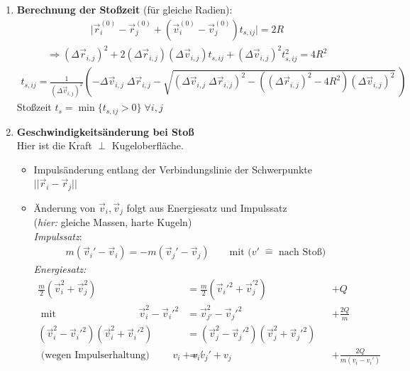 \documentclass[12pt]{article}
\begin{document}
\begin{enumerate}
\item \textbf{Berechnung der Stoßzeit} (für gleiche Radien): 
\begin{align*}
\vert \vec{r}_i^{(0)} - \vec{r}_j^{(0)} + \left( \vec{v}_i^{(0)} - \vec{v}_j^{(0)} \right) t_{s,ij}  \vert = 2 R 
\end{align*}
\begin{align*}
\Rightarrow (\Delta \vec{r}_{i,j})^2 + 2(\Delta \vec{r}_{i,j})( \Delta\vec{v}_{i,j}) t_{s,ij} + (\Delta \vec{v}_{i,j})^2 t_{s,ij}^2 = 4R^2 
\end{align*}
\begin{align*}
t_{s,ij} =
 \frac{1}{(\Delta \vec{v}_{i,j})^2} 
 \left( 
 - \Delta \vec{v}_{i,j} \; \Delta \vec{r}_{i,j} - \sqrt{( \Delta \vec{v}_{i,j} \; \Delta \vec{r}_{i,j})^2 - \left( (\Delta \vec{r}_{i,j})^2 - 4R^2\right) (\Delta \vec{v}_{i,j})^2} \; \right)
\end{align*}
Stoßzeit $t_s = \min \{ t_{s,ij} > 0\} \; \forall i,j$
\item \textbf{Geschwindigkeitsänderung bei Stoß} \\
Hier ist die Kraft $\perp$ Kugeloberfläche.
\begin{itemize}
\item Impulsänderung  entlang der Verbindungslinie der Schwerpunkte $|| \vec{r}_{i} - \vec{r}_{j} ||$
\item Änderung von $\vec{v}_{i}, \vec{v}_{j}$ folgt aus Energiesatz und Impulssatz \\
(\textit{hier:} gleiche Massen, harte Kugeln)\\ 
\textit{Impulssatz}: 
\begin{align*}
m( \vec{v}_{i}' - \vec{v}_{i}) = -m ( \vec{v}_{j}' - \vec{v}_{j})   \qquad \text{mit } (v'\; \widehat{=} \text{ nach Stoß)} 
\end{align*} 
\textit{Energiesatz:}
\begin{align*}
\frac{m}{2} (\vec{v}_{i}^2 + \vec{v}_{j}^2) &= \frac{m}{2} (\vec{v}_{i}'^2  + \vec{v}_{j}^{'2}) && + Q \\
 \mbox{ mit } \qquad \qquad \qquad \qquad  \vec{v}_{i}^2 - \vec{v}_{i}'^2 &= \vec{v}_{j'}^2 - \vec{v}_{j}'^2 && + \frac{2Q}{m} \\ 
 (\vec{v}_{i}^2-\vec{v}_{i}'^2)(\vec{v}_{i}^2 + \vec{v}_{i}'^2) &= (\vec{v}_{j}^2 - \vec{v}_{j}'^2)(\vec{v}_{j}^2 + \vec{v}_{j}'^2) \\
 \text{ (wegen Impulserhaltung) } \qquad  v_i + v_i' &= v_j' + v_j && + \frac{2Q}{m (v_i - v_i')}

\end{align*}
\end{itemize}
\end{enumerate}
\end{document}
